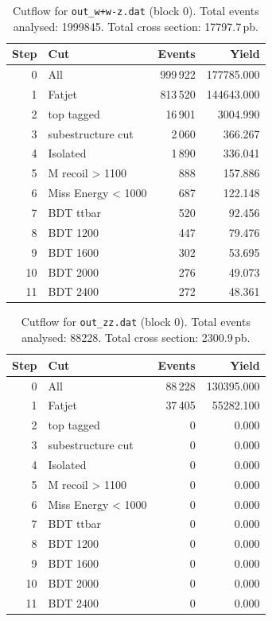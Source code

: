 \documentclass{article}
\begin{document}
\begin{table}[H]
\centering
\begin{tabular}{r l r r}
\toprule
Step & Cut & Events & Yield \\
\midrule
0 & All & 999\,922 & 177785.000 \\
1 & Fatjet & 813\,520 & 144643.000 \\
2 & top tagged & 16\,901 & 3004.990 \\
3 & subestructure cut & 2\,060 & 366.267 \\
4 & Isolated & 1\,890 & 336.041 \\
5 & M recoil > 1100 & 888 & 157.886 \\
6 & Miss Energy < 1000 & 687 & 122.148 \\
7 & BDT ttbar & 520 & 92.456 \\
8 & BDT 1200 & 447 & 79.476 \\
9 & BDT 1600 & 302 & 53.695 \\
10 & BDT 2000 & 276 & 49.073 \\
11 & BDT 2400 & 272 & 48.361 \\
\bottomrule
\end{tabular}
\caption{Cutflow for \texttt{out\_w+w-z.dat} (block 0). Total events analysed: 1999845. Total cross section: 17797.7\,pb.}
\label{tab:cutflow-out-w-w-z-dat}
\end{table}

\begin{table}[H]
\centering
\begin{tabular}{r l r r}
\toprule
Step & Cut & Events & Yield \\
\midrule
0 & All & 88\,228 & 130395.000 \\
1 & Fatjet & 37\,405 & 55282.100 \\
2 & top tagged & 0 & 0.000 \\
3 & subestructure cut & 0 & 0.000 \\
4 & Isolated & 0 & 0.000 \\
5 & M recoil > 1100 & 0 & 0.000 \\
6 & Miss Energy < 1000 & 0 & 0.000 \\
7 & BDT ttbar & 0 & 0.000 \\
8 & BDT 1200 & 0 & 0.000 \\
9 & BDT 1600 & 0 & 0.000 \\
10 & BDT 2000 & 0 & 0.000 \\
11 & BDT 2400 & 0 & 0.000 \\
\bottomrule
\end{tabular}
\caption{Cutflow for \texttt{out\_zz.dat} (block 0). Total events analysed: 88228. Total cross section: 2300.9\,pb.}
\label{tab:cutflow-out-zz-dat}
\end{table}
\end{document}
